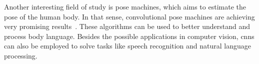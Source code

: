 Another interesting field of study is pose machines, which aims to estimate the pose of the human body. In that sense, convolutional pose machines are achieving very promising results~\cite{}. These algorithms can be used to better understand and process body language. Besides the possible applications in computer vision, \glspl{cnn} can also be employed to solve tasks like speech recognition and natural language processing.